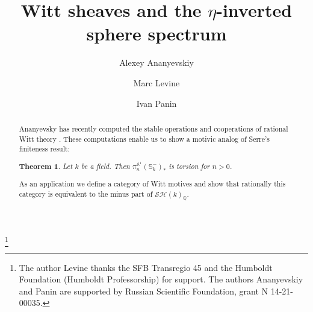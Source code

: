 \documentclass[a4paper,12pt,draft]{amsart}
\newtheorem*{thmIntr}{Theorem}
\theoremstyle{definition}
\theoremstyle{remark}
\begin{document}
\title{Witt sheaves and the $\eta$-inverted sphere spectrum}

\author{Alexey Ananyevskiy}
\address{
Chebyshev Laboratory\\ 
St. Petersburg State University\\ 
14th Line, 29b, Saint Petersburg\\ 
199178 Russia
}

\author{Marc Levine}
\address{
Universit\"at Duisburg-Essen\\
Fakult\"at Mathematik\\
Thea-Leymann-Stra{\ss}e 9\\
45127 Essen\\
Germany}
\author{Ivan Panin}
\address{St. Petersburg Branch of V. A. Steklov Mathematical Institute,
Fontanka 27, 191023 St. Petersburg, Russia}


\address{Institute for Advanced Study, Einstein Drive, Princeton, NJ, 08540, USA}




\thanks{The author Levine thanks the SFB Transregio 45 and the Humboldt Foundation (Humboldt Professorship) for support. The authors Ananyevskiy and Panin are supported by Russian Scientific Foundation, grant N 14-21-00035.}
 
\maketitle

\begin{abstract}
Ananyevsky  has recently computed the stable operations and cooperations of rational Witt theory \cite{An15}. These computations enable us to show a motivic analog of Serre's finiteness result: 
\begin{thmIntr}  Let $k$ be a field. Then $\pi^{{{\mathbb A}}^1}_ n({{\mathbb S}}^- _k )_*$ is torsion for $n > 0$. 
\end{thmIntr}
As an application we define a category of Witt motives and show that rationally this category is equivalent to the minus part of ${\mathcal{SH}}(k)_{{\mathbb Q}}$.
\end{abstract} 
\end{document}
